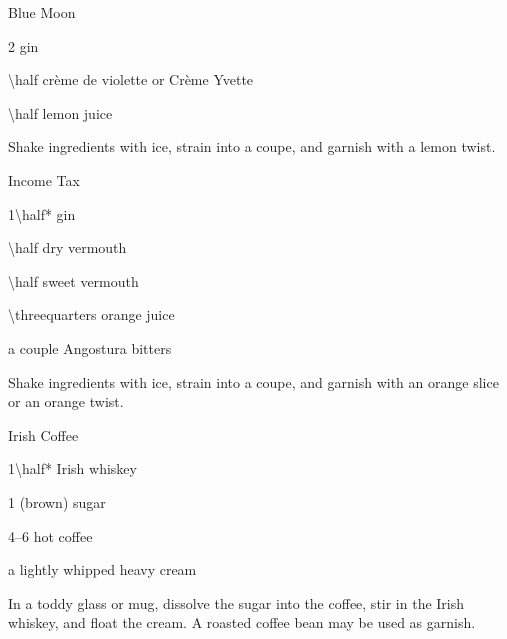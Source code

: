 \begin{Cocktail}{Blue Moon}
	\begin{Ingredients}
	\item \SI{2}{\oz} gin
	\item \SI{\half}{\oz} cr\`{e}me de violette or Cr\`{e}me Yvette
	\item \SI{\half}{\oz} lemon juice
	\end{Ingredients}
	
	\begin{Instructions}
	Shake ingredients with ice, strain into a coupe, and garnish with a lemon twist.
	\end{Instructions}
\end{Cocktail}

\begin{Cocktail}{Income Tax}
	\begin{Ingredients}
	\item \SI{1\half*}{\oz} gin
	\item \SI{\half}{\oz} dry vermouth
	\item \SI{\half}{\oz} sweet vermouth
	\item \SI{\threequarters}{\oz} orange juice
	\item a couple \si{\dashes} Angostura bitters
	\end{Ingredients}
	
	\begin{Instructions}
	Shake ingredients with ice, strain into a coupe, and garnish with an orange slice or an orange twist.
	\end{Instructions}
\end{Cocktail}

\begin{Cocktail}{Irish Coffee}
	\begin{Ingredients}
	\item \SI{1\half*}{\oz} Irish whiskey
	\item \SI{1}{\Tbsp} (brown) sugar
	\item \SIrange{4}{6}{\oz} hot coffee
	\item a \si{\splash} lightly whipped heavy cream
	\end{Ingredients}
	
	\begin{Instructions}
	In a toddy glass or mug, dissolve the sugar into the coffee, stir in the Irish whiskey, and float the cream.  A roasted coffee bean may be used as garnish.
	\end{Instructions}
\end{Cocktail}

